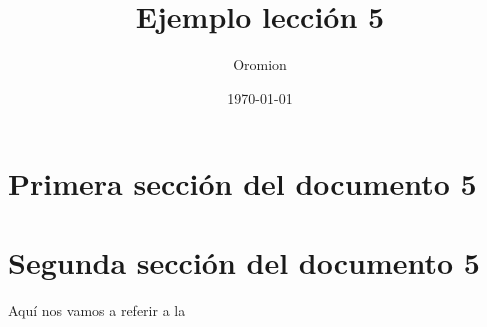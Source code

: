 \documentclass[10pt,a4paper]{article}
\title{Ejemplo lección 5}
\author{Oromion}
\date{\today}
\begin{document}
\maketitle
\tableofcontents
\section{Primera sección del documento 5}
\lipsum[2]
\section{Segunda sección del documento 5}
\lipsum[2]
Aquí nos vamos a referir a la 
\end{document}
